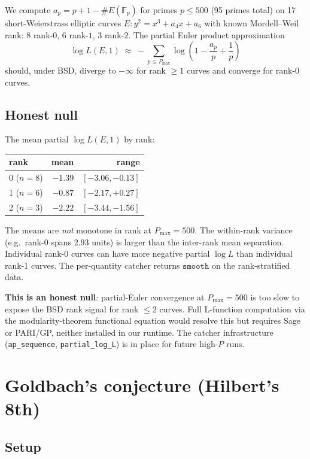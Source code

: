 \documentclass[11pt,letterpaper]{article}
\begin{document}
We compute $a_p = p + 1 - \#E(\mathbb{F}_p)$ for primes $p \le 500$ (95 primes total) on 17 short-Weierstrass elliptic curves $E: y^2 = x^3 + a_4 x + a_6$ with known Mordell--Weil rank: 8 rank-$0$, 6 rank-$1$, 3 rank-$2$. The partial Euler product approximation
\[
\log L(E, 1) \;\approx\; -\sum_{p \le P_{\max}} \log\!\left(1 - \frac{a_p}{p} + \frac{1}{p}\right)
\]
should, under BSD, diverge to $-\infty$ for rank $\ge 1$ curves and converge for rank-0 curves.

\subsection{Honest null}

The mean partial $\log L(E, 1)$ by rank:
\begin{center}
\begin{tabular}{lrr}
\toprule
rank & mean & range \\
\midrule
0 ($n=8$) & $-1.39$ & $[-3.06, -0.13]$ \\
1 ($n=6$) & $-0.87$ & $[-2.17, +0.27]$ \\
2 ($n=3$) & $-2.22$ & $[-3.44, -1.56]$ \\
\bottomrule
\end{tabular}
\end{center}

The means are \emph{not} monotone in rank at $P_{\max} = 500$. The within-rank variance (e.g.\ rank-0 spans $2.93$ units) is larger than the inter-rank mean separation. Individual rank-0 curves can have more negative partial $\log L$ than individual rank-1 curves. The per-quantity catcher returns $\mathtt{smooth}$ on the rank-stratified data.

\textbf{This is an honest null}: partial-Euler convergence at $P_{\max} = 500$ is too slow to expose the BSD rank signal for rank $\le 2$ curves. Full L-function computation via the modularity-theorem functional equation would resolve this but requires Sage \cite{sagemath} or PARI/GP, neither installed in our runtime. The catcher infrastructure (\texttt{ap\_sequence}, \texttt{partial\_log\_L}) is in place for future high-$P$ runs.

\section{Goldbach's conjecture (Hilbert's 8th)}\label{sec:goldbach}

\subsection{Setup}
\end{document}
